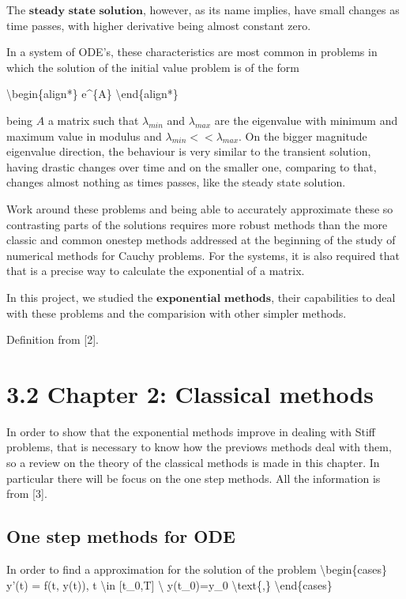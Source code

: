 \documentclass[letterpaper,10pt,english]{jupyterBook}
\begin{document}
\sphinxAtStartPar
The \(\textbf{steady state solution}\), however, as its name implies, have small changes as time passes, with higher derivative being almost constant zero.

\sphinxAtStartPar
In a system of ODE’s, these characteristics are most common in problems in which the solution of the initial value problem is of the form

\sphinxAtStartPar
\textbackslash{}begin\{align*\}
e\textasciicircum{}\{A\}
\textbackslash{}end\{align*\}

\sphinxAtStartPar
being \(A\) a matrix such that \(\lambda_{min}\) and \(\lambda_{max}\) are the eigenvalue with minimum and maximum value in modulus and \(\lambda_{min} << \lambda_{max}\). On the bigger magnitude eigenvalue direction, the behaviour is very similar to the transient solution, having drastic changes over time and on the smaller one, comparing to that, changes almost nothing as times passes, like the steady state solution.

\sphinxAtStartPar
Work around these problems and being able to accurately approximate these so contrasting parts of the solutions requires more robust methods than the more classic and common one\sphinxhyphen{}step methods addressed at the beginning of the study of numerical methods for Cauchy problems. For the systems, it is also required that that is a precise way to calculate the exponential of a matrix.

\sphinxAtStartPar
In this project, we studied the \(\textbf{exponential methods}\), their capabilities to deal with these problems and the comparision with other simpler methods.

\sphinxAtStartPar
Definition from {[}2{]}.

\sphinxstepscope


\section{3.2 Chapter 2: Classical methods}
\label{\detokenize{cap2:chapter-2-classical-methods}}\label{\detokenize{cap2::doc}}
\sphinxAtStartPar
In order to show that the exponential methods improve in dealing with Stiff problems, that is necessary to know how the previows methods deal with them, so a review on the theory of the classical methods is made in this chapter. In particular there will be focus on the one step methods. All the information is from {[}3{]}.


\subsection{One step methods for ODE}
\label{\detokenize{cap2:one-step-methods-for-ode}}
\sphinxAtStartPar
In order to find a approximation for the solution of the problem
\textbackslash{}begin\{cases\}
y’(t) = f(t, y(t)), t \textbackslash{}in {[}t\_0,T{]} \textbackslash{}
y(t\_0)=y\_0 \textbackslash{}text\{,\}
\textbackslash{}end\{cases\}
\end{document}
